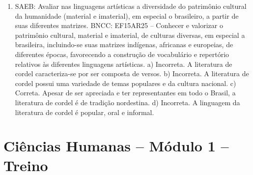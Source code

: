 \begin{enumerate}
\item
SAEB: Avaliar nas linguagens artísticas a diversidade do patrimônio
cultural da humanidade (material e imaterial), em especial o brasileiro,
a partir de suas diferentes matrizes.
BNCC: EF15AR25 – Conhecer e valorizar o patrimônio cultural, material e
imaterial, de culturas diversas, em especial a brasileira, incluindo-se
suas matrizes indígenas, africanas e europeias, de diferentes épocas,
favorecendo a construção de vocabulário e repertório relativos às
diferentes linguagens artísticas.
a) Incorreta. A literatura de cordel caracteriza-se por ser composta de versos.
b) Incorreta. A literatura de cordel possui uma variedade de temas
  populares e da cultura nacional.
c) Correta. Apesar de ser apreciada e ter representantes em todo o
  Brasil, a literatura de cordel é de tradição nordestina.
d) Incorreta. A linguagem da literatura de cordel é popular, oral e
  informal.
\end{enumerate}

\section*{Ciências Humanas – Módulo 1 – Treino}

